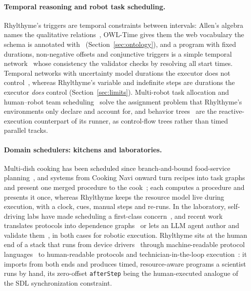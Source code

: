 \documentclass[10pt]{article}
\newcommand{\rt}{Rhylthyme}
\newcommand{\code}[1]{\texttt{#1}}
\begin{document}
\paragraph{Temporal reasoning and robot task scheduling.} \rt{}'s triggers are temporal constraints between intervals: Allen's algebra names the qualitative relations~\cite{allen1983intervals}, OWL-Time gives them the web vocabulary the schema is annotated with~\cite{hobbs2004owltime,w3c2020owltime} (Section~\ref{sec:ontology}), and a program with fixed durations, non-negative offsets and conjunctive triggers is a simple temporal network~\cite{dechter1991tcn} whose consistency the validator checks by resolving all start times. Temporal networks with uncertainty model durations the executor does not control~\cite{vidal1999stnu,morris2001dc}, whereas \rt{}'s variable and indefinite steps are durations the executor \emph{does} control (Section~\ref{sec:limits}). Multi-robot task allocation and human--robot team scheduling~\cite{gerkey2004mrta,korsah2013mrta,gombolay2018tercio} solve the assignment problem that \rt{}'s environments only declare and account for, and behavior trees~\cite{colledanchise2018bt} are the reactive-execution counterpart of its runner, as control-flow trees rather than timed parallel tracks.

\paragraph{Domain schedulers: kitchens and laboratories.} Multi-dish cooking has been scheduled since branch-and-bound food-service planning~\cite{guley1984foodservice}, and systems from Cooking Navi onward turn recipes into task graphs and present one merged procedure to the cook~\cite{hamada2005cookingnavi,tran2005collage,matsushima2015cooking,nakabe2021cooking}; each computes a procedure and presents it once, whereas \rt{} keeps the resource model live during execution, with a clock, cues, manual steps and re-runs. In the laboratory, self-driving labs have made scheduling a first-class concern~\cite{lacroix2009workflows,tom2024sdl,rahmanian2022helao,zhou2026sdlscheduling,fehlis2025artificial,dahlberg2019arteria}, and recent work translates protocols into dependence graphs~\cite{shi2024protocol} or lets an LLM agent author and validate them~\cite{angelopoulos2026prompts}, in both cases for robotic execution. \rt{} sits at the human end of a stack that runs from device drivers~\cite{sila2,opentronsapi,wierenga2023pylabrobot} through machine-readable protocol languages~\cite{autoprotocol,ananthanarayanan2010biocoder,steiner2019chemputer} to human-readable protocols and technician-in-the-loop execution~\cite{teytelman2016protocolsio,vrana2021aquarium}: it imports from both ends and produces timed, resource-aware programs a scientist runs by hand, its zero-offset \code{afterStep} being the human-executed analogue of the SDL synchronization constraint.
\end{document}
